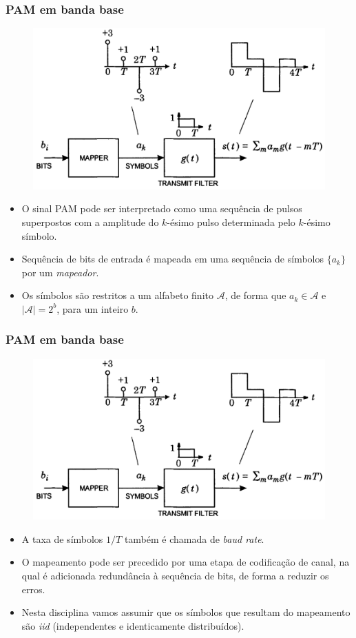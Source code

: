\begin{frame}
	\frametitle{PAM em banda base}

	\begin{figure}[t]	
	  \begin{center}
	    \includegraphics[width=0.5\columnwidth]{figs/pam_02}
	  \end{center}
	\end{figure}	
	\begin{itemize}
	    \item O sinal PAM pode ser interpretado como uma sequência de pulsos superpostos com a amplitude do $k$-ésimo pulso determinada pelo $k$-ésimo símbolo.
	    \item Sequência de bits de entrada é mapeada em uma sequência de símbolos $\{a_k\}$ por um \textit{mapeador}.
	    \item Os símbolos são restritos a um alfabeto finito $\mathcal{A}$, de forma que $a_k \in \mathcal{A}$ e $|\mathcal{A}| = 2^b$, para um inteiro $b$.
	\end{itemize}			
\end{frame}

\begin{frame}
	\frametitle{PAM em banda base}

	\begin{figure}[t]	
	  \begin{center}
	    \includegraphics[width=0.5\columnwidth]{figs/pam_02}
	  \end{center}
	\end{figure}	
	\begin{itemize}
	    \item A taxa de símbolos $1/T$ também é chamada de \textit{baud rate}.
	    \item O mapeamento pode ser precedido por uma etapa de codificação de canal, na qual é adicionada redundância à sequência de bits, de forma a reduzir os erros.
	    \item Nesta disciplina vamos assumir que os símbolos que resultam do mapeamento são \textit{iid} (independentes e identicamente distribuídos).
	\end{itemize}			
\end{frame}

